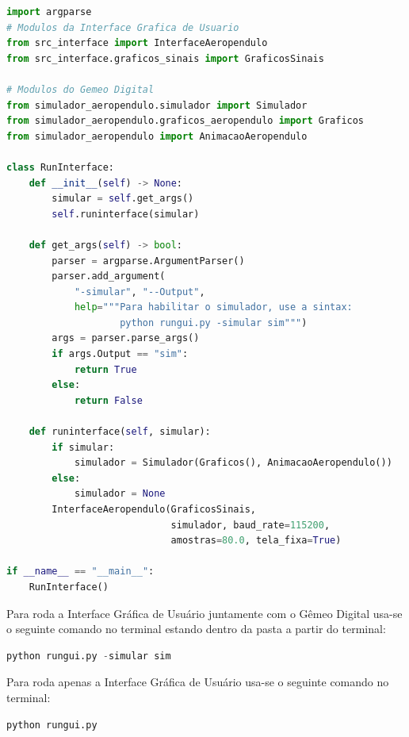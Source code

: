 \begin{lstlisting}[language=python]
import argparse
# Modulos da Interface Grafica de Usuario
from src_interface import InterfaceAeropendulo
from src_interface.graficos_sinais import GraficosSinais

# Modulos do Gemeo Digital
from simulador_aeropendulo.simulador import Simulador
from simulador_aeropendulo.graficos_aeropendulo import Graficos
from simulador_aeropendulo import AnimacaoAeropendulo

class RunInterface:
    def __init__(self) -> None:
        simular = self.get_args()
        self.runinterface(simular)

    def get_args(self) -> bool:
        parser = argparse.ArgumentParser()
        parser.add_argument(
            "-simular", "--Output",
            help="""Para habilitar o simulador, use a sintax:
                    python rungui.py -simular sim""")
        args = parser.parse_args()
        if args.Output == "sim":
            return True
        else:
            return False

    def runinterface(self, simular):
        if simular:
            simulador = Simulador(Graficos(), AnimacaoAeropendulo())
        else:
            simulador = None
        InterfaceAeropendulo(GraficosSinais,
                             simulador, baud_rate=115200,
                             amostras=80.0, tela_fixa=True)

if __name__ == "__main__":
    RunInterface()

\end{lstlisting}


Para roda a Interface Gráfica de Usuário juntamente com o Gêmeo Digital usa-se o seguinte comando no terminal estando dentro da pasta a partir do terminal:

\vspace{0.5cm}

\begin{lstlisting}[language=python]
python rungui.py -simular sim
\end{lstlisting}

Para roda apenas a Interface Gráfica de Usuário usa-se o seguinte comando no terminal:

\vspace{0.5cm}

\begin{lstlisting}[language=python]
python rungui.py
\end{lstlisting}



